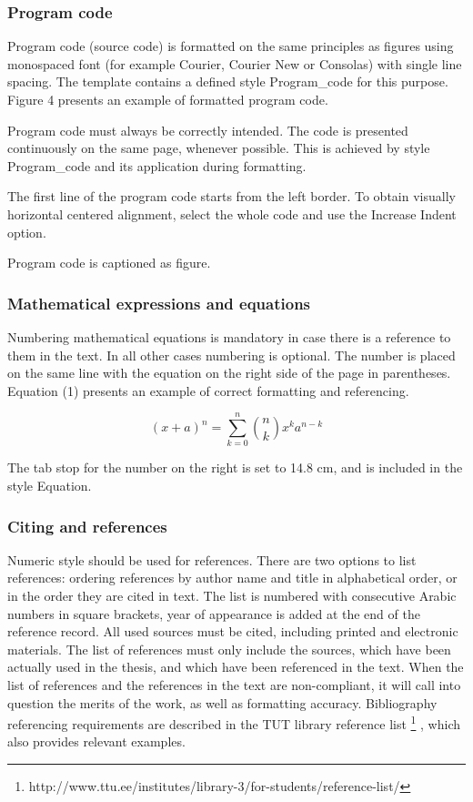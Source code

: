 \subsubsection{Program code}


Program code (source code) is formatted on the same principles as figures using monospaced font (for example Courier, Courier New or Consolas) with single line spacing. The template contains a defined style Program\_code for this purpose. Figure
4 presents an example of formatted program code.

Program code must always be correctly intended. The code is presented continuously on the same page, whenever possible. This is achieved by style Program\_code and its application during formatting.

The first line of the program code starts from the left border. To obtain visually horizontal centered alignment, select the whole code and use the Increase Indent option.

Program code is captioned as figure.


\subsubsection{Mathematical expressions and equations}

Numbering mathematical equations is mandatory in case there is a reference to them in
the text. In all other cases numbering is optional. The number is placed on the same line
with the equation on the right side of the page in parentheses. Equation (1) presents an
example of correct formatting and referencing.

\begin{equation}
(x+a)^n = \sum_{k=0}^{n} {n \choose k} x^ka^{n-k}
\end{equation}

The tab stop for the number on the right is set to 14.8 cm, and is included in the style
Equation.


\subsubsection{Citing and references}

Numeric style should be used for references. There are two options to list references:
ordering references by author name and title in alphabetical order, or in the order they are cited in text. The list is numbered with consecutive Arabic numbers in square brackets, year of appearance is added at the end of the reference record. All used sources must be cited, including printed and electronic materials. The list of references must only include the sources, which have been actually used in the thesis, and which have been referenced in the text. When the list of references and the references in the text are non-compliant, it will call into question the merits of the work, as well as formatting accuracy. Bibliography referencing requirements are described in the TUT library reference list \footnote{http://www.ttu.ee/institutes/library-3/for-students/reference-list/} , which also
provides relevant examples.

